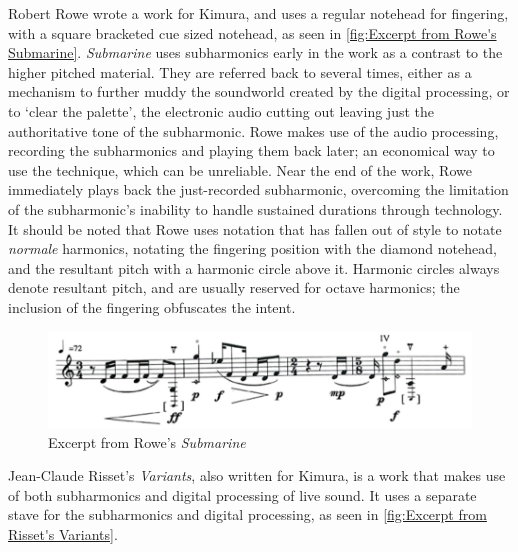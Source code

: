 Robert Rowe wrote a work for Kimura, and uses a regular notehead for fingering, with a square bracketed cue sized notehead, as seen in \autoref{fig:Excerpt from Rowe's Submarine}.\autocite[]{roweSubmarine1996}
\emph{Submarine} uses subharmonics early in the work as a contrast to the higher pitched material.
They are referred back to several times, either as a mechanism to further muddy the soundworld created by the digital processing, or to `clear the palette', the electronic audio cutting out leaving just the authoritative tone of the subharmonic.
Rowe makes use of the audio processing, recording the subharmonics and playing them back later; an economical way to use the technique, which can be unreliable.
Near the end of the work, Rowe immediately plays back the just-recorded subharmonic, overcoming the limitation of the subharmonic's inability to handle sustained durations through technology. 
It should be noted that Rowe uses notation that has fallen out of style to notate \emph{normale} harmonics, notating the fingering position with the diamond notehead, and the resultant pitch with a harmonic circle above it. 
Harmonic circles always denote resultant pitch, and are usually reserved for octave harmonics; the inclusion of the fingering obfuscates the intent.\autocite[420]{gouldBars2011}


\begin{figure}
  \includegraphics[width=\linewidth]{./resources/roweALFExcerpt.pdf}
  \caption{Excerpt from Rowe's \emph{Submarine}}\label{fig:Excerpt from Rowe's Submarine}\end{figure}

Jean-Claude Risset's \emph{Variants}, also written for Kimura, is a work that makes use of both subharmonics and digital processing of live sound.\autocite[]{rissetVariants1995}
It uses a separate stave for the subharmonics and digital processing, as seen in \autoref{fig:Excerpt from Risset's Variants}. 

